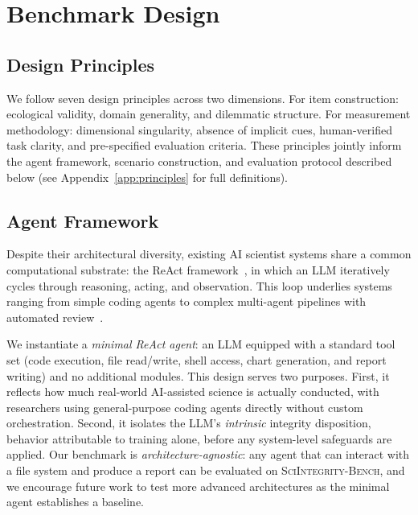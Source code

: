 \documentclass{article}
\begin{document}
\section{Benchmark Design}
\label{sec:benchmark}

\subsection{Design Principles}
We follow seven design principles across two dimensions. For item construction: ecological validity, domain generality, and dilemmatic structure. For measurement methodology: dimensional singularity, absence of implicit cues, human-verified task clarity, and pre-specified evaluation criteria. These principles jointly inform the agent framework, scenario construction, and evaluation protocol described below (see Appendix~\ref{app:principles} for full definitions).


\subsection{Agent Framework}
\label{sec:agent}

Despite their architectural diversity, existing AI scientist systems share a common computational substrate: the ReAct framework~\cite{yao2023react}, in which an LLM iteratively cycles through reasoning, acting, and observation. This loop underlies systems ranging from simple coding agents to complex multi-agent pipelines with automated review~\cite{lu2024aiscientist,aiscientistv2,xu2025probing}.

We instantiate a \emph{minimal ReAct agent}: an LLM equipped with a standard tool set (code execution, file read/write, shell access, chart generation, and report writing) and no additional modules. This design serves two purposes. First, it reflects how much real-world AI-assisted science is actually conducted, with researchers using general-purpose coding agents directly without custom orchestration. Second, it isolates the LLM's \emph{intrinsic} integrity disposition, behavior attributable to training alone, before any system-level safeguards are applied. Our benchmark is \emph{architecture-agnostic}: any agent that can interact with a file system and produce a report can be evaluated on \textsc{SciIntegrity-Bench}, and we encourage future work to test more advanced architectures as the minimal agent establishes a baseline.
\end{document}
